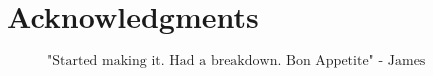 \chapter{Acknowledgments}


\begin{figure}[b]
$$\mbox{"Started making it. Had a breakdown. Bon Appetite" - James Acaster}$$
\end{figure}

